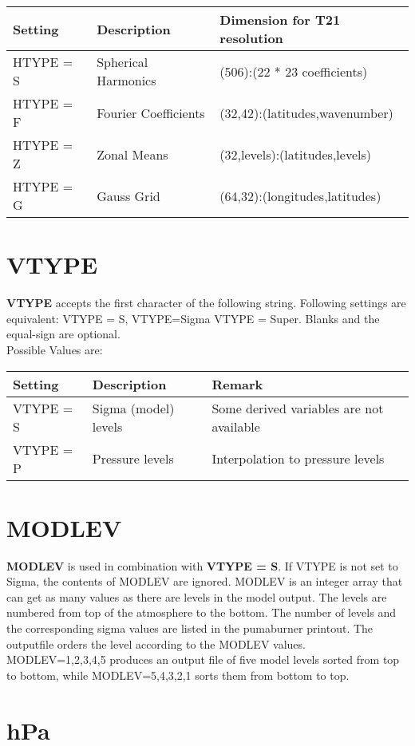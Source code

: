 \begin{tabular}{|l|l|l|}
\hline
   Setting   & Description          & Dimension for T21 resolution   \\
\hline
   HTYPE = S & Spherical Harmonics  & (506):(22 * 23 coefficients)   \\
   HTYPE = F & Fourier Coefficients & (32,42):(latitudes,wavenumber) \\
   HTYPE = Z & Zonal Means          & (32,levels):(latitudes,levels) \\
   HTYPE = G & Gauss Grid           & (64,32):(longitudes,latitudes) \\
\hline
\end{tabular}

\section{VTYPE}

{\bf VTYPE} accepts the first character of the following string.
Following settings are equivalent: VTYPE = S, VTYPE=Sigma
VTYPE = Super. Blanks and the equal-sign are optional. \\
Possible Values are:

\begin{tabular}{|l|l|l|}
\hline
   Setting   & Description          & Remark \\
\hline
   VTYPE = S & Sigma (model) levels & Some derived variables are not available \\
   VTYPE = P & Pressure levels      & Interpolation to pressure levels \\
\hline
\end{tabular}

\section{MODLEV}

{\bf MODLEV} is used in combination with {\bf VTYPE = S}.
If VTYPE is not set to Sigma, the contents of MODLEV are ignored.
MODLEV is an integer array that can get as many values as there are
levels in the model output. The levels are numbered from top of
the atmosphere to the bottom. The number of levels and the 
corresponding sigma values are listed in the pumaburner printout.
The outputfile orders the level according to the MODLEV values.
MODLEV=1,2,3,4,5 produces an output file of five model levels
sorted from top to bottom, while MODLEV=5,4,3,2,1 sorts them
from bottom to top.

\section{hPa}

